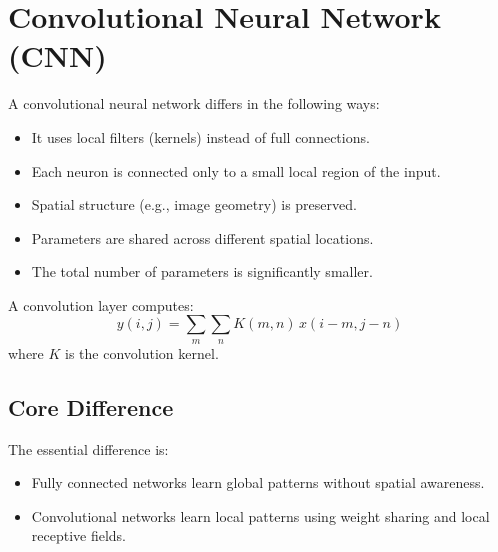 \documentclass[a4paper]{article}
\title{}
\date{}
\begin{document}
    \maketitle
    
    
    \section{Convolutional Neural Network (CNN)}
        
        A convolutional neural network differs in the following ways:
        
        \begin{itemize}
            \item It uses local filters (kernels) instead of full connections.
            \item Each neuron is connected only to a small local region of the input.
            \item Spatial structure (e.g., image geometry) is preserved.
            \item Parameters are shared across different spatial locations.
            \item The total number of parameters is significantly smaller.
        \end{itemize}
        
        A convolution layer computes:
        \[
            y(i,j) = \sum_{m}\sum_{n} K(m,n)\,x(i-m,j-n)
        \]
        where \( K \) is the convolution kernel.
        
        \subsection{Core Difference}
            
            The essential difference is:
            
            \begin{itemize}
                \item Fully connected networks learn global patterns without spatial awareness.
                \item Convolutional networks learn local patterns using weight sharing and local receptive fields.
            \end{itemize}
    
\end{document}
